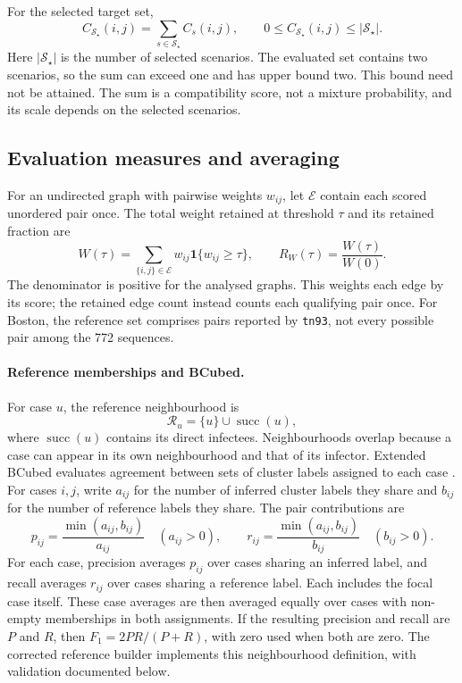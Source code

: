 For the selected target set,
\[
    C_{\mathcal{S}_\star}(i,j)
    =\sum_{s\in\mathcal{S}_\star}C_s(i,j),
    \qquad
    0\le C_{\mathcal{S}_\star}(i,j)\le |\mathcal{S}_\star|.
\]
Here $|\mathcal{S}_\star|$ is the number of selected scenarios. The evaluated set contains two scenarios, so the sum can exceed one and has upper bound two. This bound need not be attained. The sum is a compatibility score, not a mixture probability, and its scale depends on the selected scenarios.

\subsection{Evaluation measures and averaging}\label{sec:app_ch3_evaluation_definitions}

For an undirected graph with pairwise weights $w_{ij}$, let $\mathcal{E}$ contain each scored unordered pair once. The total weight retained at threshold $\tau$ and its retained fraction are
\[
    W(\tau)=\sum_{\{i,j\}\in\mathcal{E}}w_{ij}\mathbf{1}\{w_{ij}\ge\tau\},
    \qquad R_W(\tau)=\frac{W(\tau)}{W(0)}.
\]
The denominator is positive for the analysed graphs. This weights each edge by its score; the retained edge count instead counts each qualifying pair once. For Boston, the reference set comprises pairs reported by \texttt{tn93}, not every possible pair among the 772 sequences.

\paragraph{Reference memberships and BCubed.}
For case $u$, the reference neighbourhood is
\[
    \mathcal{R}_u=\{u\}\cup\operatorname{succ}(u),
\]
where $\operatorname{succ}(u)$ contains its direct infectees. Neighbourhoods overlap because a case can appear in its own neighbourhood and that of its infector. Extended BCubed evaluates agreement between sets of cluster labels assigned to each case \citep{Amigo2008}. For cases $i,j$, write $a_{ij}$ for the number of inferred cluster labels they share and $b_{ij}$ for the number of reference labels they share. The pair contributions are
\[
    p_{ij}=\frac{\min(a_{ij},b_{ij})}{a_{ij}}\quad(a_{ij}>0),
    \qquad
    r_{ij}=\frac{\min(a_{ij},b_{ij})}{b_{ij}}\quad(b_{ij}>0).
\]
For each case, precision averages $p_{ij}$ over cases sharing an inferred label, and recall averages $r_{ij}$ over cases sharing a reference label. Each includes the focal case itself. These case averages are then averaged equally over cases with non-empty memberships in both assignments. If the resulting precision and recall are $P$ and $R$, then $F_1=2PR/(P+R)$, with zero used when both are zero. The corrected reference builder implements this neighbourhood definition, with validation documented below.

